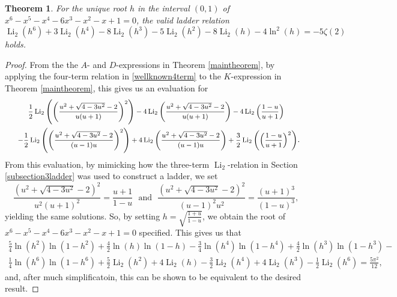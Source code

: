 \documentclass[12pt]{article}
\newtheorem{theorem}{Theorem}
\begin{document}
\begin{theorem}\label{firstformatladder}
 For the unique root $h$ in the interval $(0, 1)$ of $x^6-x^5-x^4-6 x^3-x^2-x+1 = 0$, the valid ladder relation 
 $$ \operatorname{Li}_{2}\left( h^{6} \right) + 3 \operatorname{Li}_{2}\left( h^{4} \right) 
 - 8 \operatorname{Li}_{2}\left( h^{3} \right) - 5 \operatorname{Li}_{2}\left( h^2 \right) 
 - 8 \operatorname{Li}_{2}(h) - 4 \ln^2(h) = - 5 \zeta(2) $$ 
 holds. 
\end{theorem}

\begin{proof}
 From the the $A$- and $D$-expressions in Theorem \ref{maintheorem}, by applying the four-term relation 
 in \eqref{wellknown4term} to the $K$-expression in Theorem \ref{maintheorem}, this gives us an evaluation for 
\begin{multline*}
 \text{ {\footnotesize $ \frac{1}{2} \operatorname{Li}_2\left(\left(\frac{u^2 + \sqrt{4 - 3 u^2} - 2}{u(u + 
 1)}\right)^2\right) - 4 \operatorname{Li}_2\left(\frac{u^2 + \sqrt{4 - 3 u^2} - 2}{u(u + 1)}\right) - 
 4 \operatorname{Li}_2\left(\frac{1 - u}{u + 1}\right) $} } \\ 
 \text{ { \footnotesize$ - \frac{1}{2} \operatorname{Li}_2\left(\left(\frac{u^2 + \sqrt{4 - 3 u^2} - 2}{(u - 1) u}\right)^2\right) + 
 4 \operatorname{Li}_2\left(\frac{u^2 + \sqrt{4 - 3 u^2} - 2}{(u - 1) u}\right) 
 + \frac{3}{2} \operatorname{Li}_2\left(\left(\frac{1 - u}{u + 1}\right)^2\right) 
 $}}. 
\end{multline*}
 From this evaluation, by mimicking how the three-term $\operatorname{Li}_{2}$-relation in Section \ref{subsection3ladder} was used to 
 construct a ladder, we set $$ \frac{\left(u^2 + \sqrt{4 - 3u^2} - 2\right)^2}{u^2 (u + 1)^2} = \frac{u + 1}{1 - u} \ \ \ \text{and} \ \ \ 
 \frac{\left(u^2 + \sqrt{4 - 3u^2} - 2\right)^2}{(u - 1)^2 u^2} = \frac{(u + 1)^3}{(1 - u)^3}, $$ yielding the same solutions. So, by setting 
 $h = \sqrt{\frac{1 + u}{1 - u}}$, we obtain the root of $x^6 - x^5 - x^4 - 6 x^3 - x^2 - x + 1 =0$ specified. This gives us that 
\begin{multline*}
 \frac{5}{4} \ln(h^2)\ln(1 - h^2) + \frac{4}{2} \ln(h)\ln(1 - h) - \frac{3}{4} \ln(h^4)\ln(1 - h^4) + \frac{4}{2} \ln(h^3)\ln(1 - 
 h^3) - \\ 
 \frac{1}{4} \ln(h^6)\ln(1 - h^6) + \frac{5}{2} \operatorname{Li}_2(h^2) + 
 4 \operatorname{Li}_2(h) - \frac{3}{2} \operatorname{Li}_2(h^4) + 
 4 \operatorname{Li}_2(h^3) - \frac{1}{2} \operatorname{Li}_2(h^6) = \frac{5\pi^2}{12}, 
\end{multline*}
 and, after much simplificatoin, this can be shown to be equivalent to the desired result. 
\end{proof}
\end{document}
